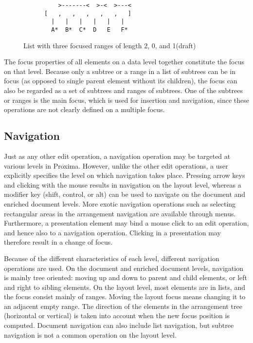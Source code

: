 \begin{figure}
\begin{small}
\begin{center}
\begin{verbatim}
          >-------<  >-<  >---<          
      [   ,   ,   ,   ,   ,   ]
        |   |   |   |   |   |
        A*  B*  C*  D   E   F*

\end{verbatim}
\caption{List with three focused ranges of length 2, 0, and 1(draft)}\label{listFocus} 
\end{center}
\end{small}
\end{figure}


The focus properties of all elements on a data level together constitute the focus on that level. Because only a subtree or a range in a list of subtrees can be in focus (as opposed to single parent element without its children), the focus can also be regarded as a set of subtrees and ranges of subtrees. One of the subtrees or ranges is the main focus, which is used for insertion and navigation, since these operations are not clearly defined on a multiple focus. 
 
 
%									
\subsection{Navigation}

Just as any other edit operation, a navigation operation may be targeted at various levels in Proxima. However, unlike the other edit operations, a user explicitly specifies the level on which navigation takes place. Pressing arrow keys and clicking with the mouse results in navigation on the layout level, whereas a modifier key (shift, control, or alt) can be used to navigate on the document and enriched document levels. More exotic navigation operations such as selecting rectangular areas in the arrangement navigation are available through menus. Furthermore, a presentation element may bind a mouse click to an edit operation, and hence also to a navigation operation. Clicking in a presentation may therefore result in a change of focus.

Because of the different characteristics of each level, different navigation operations are used. On the document and enriched document levels, navigation is mainly tree oriented: moving up and down to parent and child elements, or left and right to sibling elements. On the layout level, most elements are in lists, and the focus consist mainly of ranges. Moving the layout focus means changing it to an adjacent empty range. The direction of the elements in the arrangement tree (horizontal or vertical) is taken into account when the new focus position is computed. Document navigation can also include list navigation, but subtree navigation is not a common operation on the layout level.

